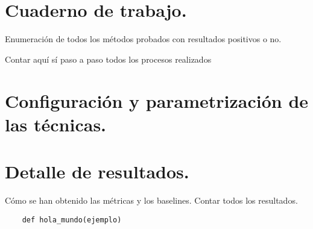 


\section{Cuaderno de trabajo.}

Enumeración de todos los métodos probados con resultados positivos o no.

Contar aquí sí paso a paso todos los procesos realizados

\section{Configuración y parametrización de las técnicas.}



\section{Detalle de resultados.}

Cómo se han obtenido las métricas y los baselines. Contar todos los resultados.

\begin{verbatim}
    def hola_mundo(ejemplo)
\end{verbatim}